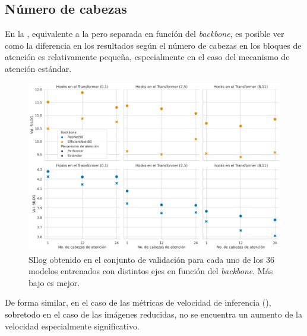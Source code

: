 \subsection{Número de cabezas}\label{resultados-cuantitativos-cabezas}

En la , equivalente a la  pero separada en función del \textit{backbone}, es posible ver como la diferencia en los resultados según el número de cabezas en los bloques de atención es relativamente pequeña, especialmente en el caso del mecanismo de atención estándar.

\begin{figure}[H]
\centering
\includegraphics[width=\linewidth]{imagenes/Resultados/SIlog_val_split.png} 
\captionsetup{width=.95\linewidth}
\caption{SIlog obtenido en el conjunto de validación para cada uno de los 36 modelos entrenados con distintos ejes en función del \textit{backbone}. Más bajo es mejor.}
\label{fig:SIlog-val-split}
\end{figure}

De forma similar, en el caso de las métricas de velocidad de inferencia (), sobretodo en el caso de las imágenes reducidas, no se encuentra un aumento de la velocidad especialmente significativo.

